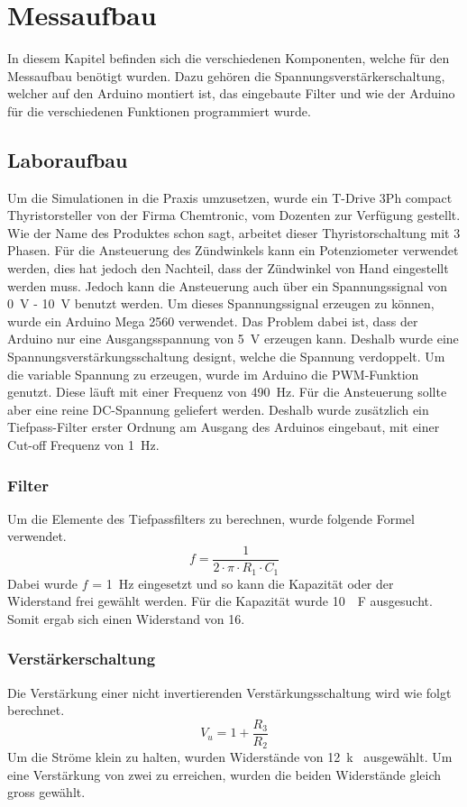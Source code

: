 \section{Messaufbau}
In diesem Kapitel befinden sich die verschiedenen Komponenten, welche für den Messaufbau benötigt wurden. Dazu gehören die Spannungsverstärkerschaltung, welcher auf den Arduino montiert ist, das eingebaute Filter und wie der Arduino für die verschiedenen Funktionen programmiert wurde.
\subsection{Laboraufbau}
Um die Simulationen in die Praxis umzusetzen, wurde ein \grqq T-Drive 3Ph compact Thyristorsteller\grqq \hspace{0.03cm} von der Firma Chemtronic, vom Dozenten zur Verfügung gestellt. Wie der Name des Produktes schon sagt, arbeitet dieser Thyristorschaltung mit 3 Phasen. Für die Ansteuerung des Zündwinkels kann ein Potenziometer verwendet werden, dies hat jedoch den Nachteil, dass der Zündwinkel von Hand eingestellt werden muss. Jedoch kann die Ansteuerung auch über ein Spannungssignal von \SI{0}{V} - \SI{10}{V} benutzt werden. Um dieses Spannungssignal erzeugen zu können, wurde ein Arduino Mega 2560 verwendet. Das Problem dabei ist, dass der Arduino nur eine Ausgangsspannung von \SI{5}{V} erzeugen kann. Deshalb wurde eine Spannungsverstärkungsschaltung designt, welche die Spannung verdoppelt. Um die variable Spannung zu erzeugen, wurde im Arduino die PWM-Funktion genutzt. Diese läuft mit einer Frequenz von \SI{490}{Hz}. Für die Ansteuerung sollte aber eine reine DC-Spannung geliefert werden. Deshalb wurde zusätzlich ein Tiefpass-Filter erster Ordnung am Ausgang des Arduinos eingebaut, mit einer Cut-off Frequenz von \SI{1}{Hz}.  


\subsubsection{Filter}
Um die Elemente des Tiefpassfilters zu berechnen, wurde folgende Formel verwendet.
\begin{equation}
f = \frac{1}{2 \cdot \pi \cdot R_1 \cdot C_1}
\end{equation}
Dabei wurde $f$ = \SI{1}{Hz} eingesetzt und so kann die Kapazität oder der Widerstand frei gewählt werden. Für die Kapazität wurde \SI{10}{\mu F} ausgesucht. Somit ergab sich einen Widerstand von \SI{16}{\Omega}. 


\subsubsection{Verstärkerschaltung}
Die Verstärkung einer nicht invertierenden Verstärkungsschaltung wird wie folgt berechnet.
\begin{equation}
V_u = 1 + \frac{R_3}{R_2}
\end{equation}
Um die Ströme klein zu halten, wurden Widerstände von \SI{12}{k\Omega} ausgewählt. Um eine Verstärkung von zwei zu erreichen, wurden die beiden Widerstände gleich gross gewählt. 

